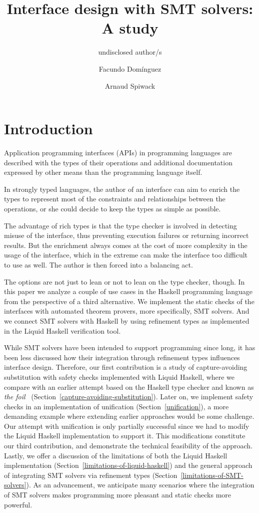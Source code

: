 \documentclass[acmtog, anonymous]{acmart}
\title{Interface design with SMT solvers: A study}
\author{undisclosed author/s}
\author{Facundo Domínguez}
\affiliation{
     \institution{Tweag}
     \country{Uruguay}
}
\author{Arnaud Spiwack}
\affiliation{
     \institution{Tweag}
     \country{Japan}
}
\begin{document}
\maketitle

\section{Introduction}

Application programming interfaces (APIs) in programming languages are described
with the types of their operations and additional documentation expressed by
other means than the programming language itself.

In strongly typed languages, the author of an interface can aim to enrich the
types to represent most of the constraints and relationships between the
operations, or she could decide to keep the types as simple as possible.

The advantage of rich types is that the type checker is involved in detecting
misuse of the interface, thus preventing execution failures or returning
incorrect results. But the enrichment always comes at the cost of more
complexity in the usage of the interface, which in the extreme can make the
interface too difficult to use as well. The author is then forced into a
balancing act.

The options are not just to lean or not to lean on the type checker, though. In
this paper we analyze a couple of use cases in the Haskell programming language
from the perspective of a third alternative. We implement the static checks of
the interfaces with automated theorem provers, more specifically, SMT solvers.
And we connect SMT solvers with Haskell by using refinement types as implemented
in the Liquid Haskell verification tool.

While SMT solvers have been intended to support programming since long, it has
been less discussed how their integration through refinement types influences
interface design. Therefore, our first contribution is a study of
capture-avoiding substitution with safety checks implemented with Liquid Haskell,
where we compare with an earlier attempt based on the Haskell type checker and known as
\textit{the foil}~\cite{maclaurin2022foil}
(Section~\ref{capture-avoiding-substitution}). Later on, we implement safety checks
in an implementation of unification (Section~\ref{unification}), a more demanding
example where extending earlier approaches would be some challenge. Our
attempt with unification is only partially successful since we had to
modify the Liquid Haskell implementation to support it. This modifications
constitute our third contribution, and demonstrate the technical feasibility
of the approach. Lastly, we offer a discussion
of the limitations of both the Liquid Haskell implementation (Section~\ref{limitations-of-liquid-haskell}) and the
general approach of integrating SMT solvers via refinement
types (Section~\ref{limitations-of-SMT-solvers}). As an advancement, we
anticipate many scenarios where the integration of SMT
solvers makes programming more pleasant and static checks more powerful.
\end{document}
